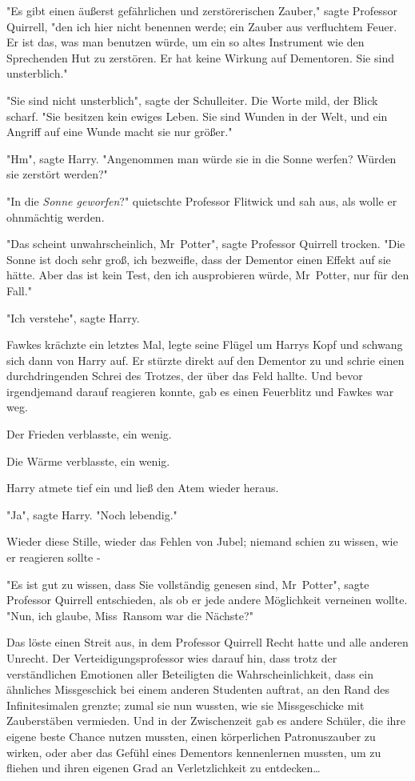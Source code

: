 {"Es gibt einen äußerst gefährlichen und zerstörerischen Zauber," sagte Professor Quirrell, "den ich hier nicht benennen werde; ein Zauber aus verfluchtem Feuer. Er ist das, was man benutzen würde, um ein so altes Instrument wie den Sprechenden Hut zu zerstören. Er hat keine Wirkung auf Dementoren. Sie sind unsterblich."

"Sie sind nicht unsterblich", sagte der Schulleiter. Die Worte mild, der Blick scharf. "Sie besitzen kein ewiges Leben. Sie sind Wunden in der Welt, und ein Angriff auf eine Wunde macht sie nur größer."

"Hm", sagte Harry. "Angenommen man würde sie in die Sonne werfen? Würden sie zerstört werden?"

"In die \emph{Sonne geworfen}?" quietschte Professor Flitwick und sah aus, als wolle er ohnmächtig werden.

"Das scheint unwahrscheinlich, Mr~Potter", sagte Professor Quirrell trocken. "Die Sonne ist doch sehr groß, ich bezweifle, dass der Dementor einen Effekt auf sie hätte. Aber das ist kein Test, den ich ausprobieren würde, Mr~Potter, nur für den Fall."

"Ich verstehe", sagte Harry.

Fawkes krächzte ein letztes Mal, legte seine Flügel um Harrys Kopf und schwang sich dann von Harry auf. Er stürzte direkt auf den Dementor zu und schrie einen durchdringenden Schrei des Trotzes, der über das Feld hallte. Und bevor irgendjemand darauf reagieren konnte, gab es einen Feuerblitz und Fawkes war weg.

Der Frieden verblasste, ein wenig.

Die Wärme verblasste, ein wenig.

Harry atmete tief ein und ließ den Atem wieder heraus.

"Ja", sagte Harry. "Noch lebendig."

Wieder diese Stille, wieder das Fehlen von Jubel; niemand schien zu wissen, wie er reagieren sollte -

"Es ist gut zu wissen, dass Sie vollständig genesen sind, Mr~Potter", sagte Professor Quirrell entschieden, als ob er jede andere Möglichkeit verneinen wollte. "Nun, ich glaube, Miss~Ransom war die Nächste?"

Das löste einen Streit aus, in dem Professor Quirrell Recht hatte und alle anderen Unrecht. Der Verteidigungsprofessor wies darauf hin, dass trotz der verständlichen Emotionen aller Beteiligten die Wahrscheinlichkeit, dass ein ähnliches Missgeschick bei einem anderen Studenten auftrat, an den Rand des Infinitesimalen grenzte; zumal sie nun wussten, wie sie Missgeschicke mit Zauberstäben vermieden. Und in der Zwischenzeit gab es andere Schüler, die ihre eigene beste Chance nutzen mussten, einen körperlichen Patronuszauber zu wirken, oder aber das Gefühl eines Dementors kennenlernen mussten, um zu fliehen und ihren eigenen Grad an Verletzlichkeit zu entdecken…

}
